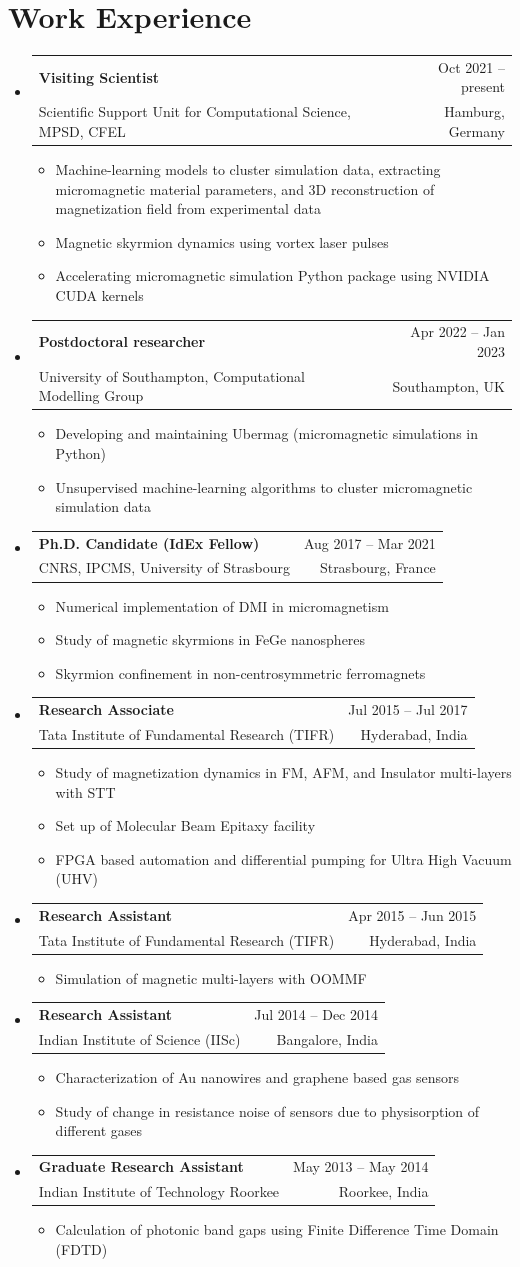 \documentclass[A4,11pt]{article}
\makeatletter
\newcommand{\CVItem}[1]{
  \item\small{
    {#1 \vspace{-2pt}}
  }
}
\newcommand{\CVSubheading}[4]{
  \vspace{-2pt}\item
    \begin{tabular*}{0.97\textwidth}[t]{l@{\extracolsep{\fill}}r}
      \textbf{#1} & #2 \\
      \small#3 & \small #4 \\
    \end{tabular*}\vspace{-7pt}
}
\newcommand{\CVSubHeadingListStart}{\begin{itemize}[leftmargin=0.5cm, label={}]}
\newcommand{\CVSubHeadingListEnd}{\end{itemize}}
\newcommand{\CVItemListStart}{\begin{itemize}}
\newcommand{\CVItemListEnd}{\end{itemize}\vspace{-5pt}}
\makeatother
\begin{document}
\section{Work Experience}
  \CVSubHeadingListStart
    \CVSubheading
      {Visiting Scientist}{Oct 2021 -- present}
      {Scientific Support Unit for Computational Science, MPSD, CFEL}{Hamburg, Germany}
      \CVItemListStart
        \CVItem{Machine-learning models to cluster simulation data,
          extracting micromagnetic material parameters, and 3D reconstruction of
          magnetization field from experimental data}
        \CVItem{Magnetic skyrmion dynamics using vortex laser pulses}
        \CVItem{Accelerating micromagnetic simulation Python package using NVIDIA
          CUDA kernels}
      \CVItemListEnd
    \CVSubheading
      {Postdoctoral researcher}{Apr 2022 -- Jan 2023}
      {University of Southampton, Computational Modelling Group}{Southampton, UK}
      \CVItemListStart
        \CVItem{Developing and maintaining Ubermag (micromagnetic simulations in Python)}
        \CVItem{Unsupervised machine-learning algorithms to cluster micromagnetic simulation data}
      \CVItemListEnd
    \CVSubheading
    {Ph.D. Candidate (IdEx Fellow)}{Aug 2017 -- Mar 2021}
      {CNRS, IPCMS, University of Strasbourg}{Strasbourg, France}
      \CVItemListStart
        \CVItem{Numerical implementation of DMI in micromagnetism}
        \CVItem{Study of magnetic skyrmions in FeGe nanospheres}
        \CVItem{Skyrmion confinement in non-centrosymmetric ferromagnets}
      \CVItemListEnd
    \CVSubheading
    {Research Associate}{Jul 2015 -- Jul 2017}
     {Tata Institute of Fundamental Research (TIFR)}{Hyderabad, India}
      \CVItemListStart
        \CVItem{Study of magnetization dynamics in FM, AFM, and Insulator multi-layers with STT}
        \CVItem{Set up of Molecular Beam Epitaxy facility}
        \CVItem{FPGA based automation and differential pumping for Ultra High
          Vacuum (UHV)}
      \CVItemListEnd
    \CVSubheading
    {Research Assistant}{Apr 2015 -- Jun 2015}
     {Tata Institute of Fundamental Research (TIFR)}{Hyderabad, India}
      \CVItemListStart
        \CVItem{Simulation of magnetic multi-layers with OOMMF}
      \CVItemListEnd
    \CVSubheading
    {Research Assistant}{Jul 2014 -- Dec 2014}
     {Indian Institute of Science (IISc)}{Bangalore, India}
      \CVItemListStart
        \CVItem{Characterization of Au nanowires and graphene based gas sensors}
        \CVItem{Study of change in resistance noise of sensors due to physisorption of different gases}
      \CVItemListEnd
    \CVSubheading
    {Graduate Research Assistant}{May 2013 -- May 2014}
      {Indian Institute of Technology Roorkee}{Roorkee, India}
      \CVItemListStart
        \CVItem{Calculation of photonic band gaps using Finite Difference Time Domain (FDTD)}
      \CVItemListEnd
  \CVSubHeadingListEnd
\end{document}
